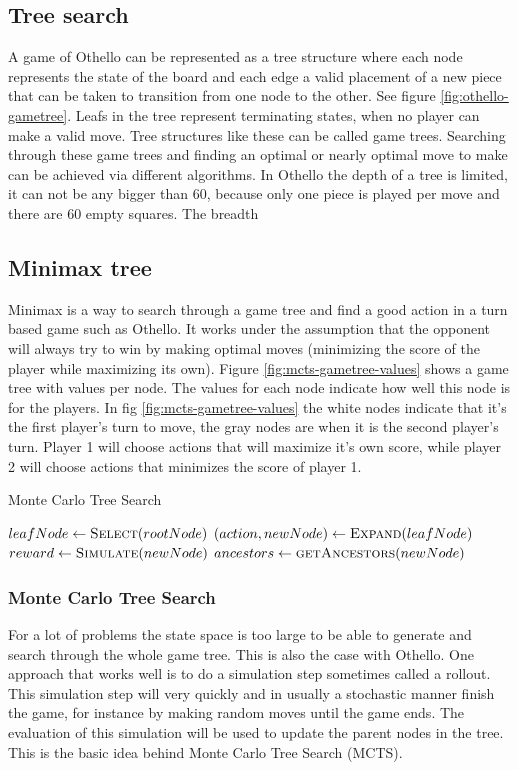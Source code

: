 \documentclass[10pt,letterpaper]{article}
\begin{document}
\subsection{Tree search}
A game of Othello can be represented as a tree structure where each node represents the state of the board and each edge a valid placement of a new piece that can be taken to transition from one node to the other. See figure \ref{fig:othello-gametree}. Leafs in the tree represent terminating states, when no player can make a valid move. Tree structures like these can be called game trees. Searching through these game trees and finding an optimal or nearly optimal move to make can be achieved via different algorithms. In Othello the depth of a tree is limited, it can not be any bigger than 60, because only one piece is played per move and there are 60 empty squares. The breadth 

\subsection{Minimax tree}
Minimax is a way to search through a game tree and find a good action in a turn based game such as Othello. It works under the assumption that the opponent will always try to win by making optimal moves (minimizing the score of the player while maximizing its own). Figure \ref{fig:mcts-gametree-values} shows a game tree with values per node. The values for each node indicate how well this node is for the players. In fig \ref{fig:mcts-gametree-values} the white nodes indicate that it's the first player's turn to move, the gray nodes are when it is the second player's turn. Player 1 will choose actions that will maximize it's own score, while player 2 will choose actions that minimizes the score of player 1.

\begin{algorithm}
\caption{Monte Carlo Tree Search}
\label{algo:mcts}
\begin{algorithmic}
\State $leafNode \gets \Call{Select}{rootNode}$
\State $(action, newNode) \gets \Call{Expand}{leafNode}$
\State $reward \gets \Call{Simulate}{newNode}$
\State $ancestors \gets \Call{getAncestors}{newNode}$
\State \Return {}
\EndWhile
\State \Return {}
\EndFunction
\end{algorithmic}
\end{algorithm}
\subsubsection{Monte Carlo Tree Search}
For a lot of problems the state space is too large to be able to generate and search through the whole game tree. This is also the case with Othello. One approach that works well is to do a simulation step sometimes called a rollout. This simulation step will very quickly and in usually a stochastic manner finish the game, for instance by making random moves until the game ends. The evaluation of this simulation will be used to update the parent nodes in the tree. This is the basic idea behind Monte Carlo Tree Search (MCTS).
\end{document}
